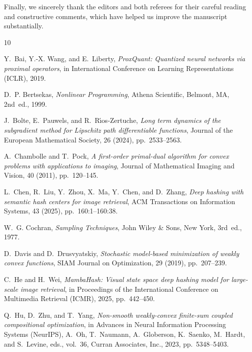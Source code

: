 \documentclass[11pt]{article}
\begin{document}
\bigskip
\noindent Finally, we sincerely thank the editors and both referees for their careful reading and constructive comments, which have helped us improve the manuscript substantially.

% 
% 
\begin{thebibliography}{10}

{\sc Y.~Bai, Y.-X. Wang, and E.~Liberty}, {\em {ProxQuant}: Quantized neural
  networks via proximal operators}, in International Conference on Learning
  Representations (ICLR), 2019.

{\sc D.~P. Bertsekas}, {\em Nonlinear Programming}, Athena Scientific, Belmont,
  MA, 2nd~ed., 1999.

{\sc J.~Bolte, E.~Pauwels, and R.~R{\'\i}os-Zertuche}, {\em Long term dynamics
  of the subgradient method for {L}ipschitz path differentiable functions},
  Journal of the European Mathematical Society, 26 (2024), pp.~2533--2563.

{\sc A.~Chambolle and T.~Pock}, {\em A first-order primal-dual algorithm for
  convex problems with applications to imaging}, Journal of Mathematical
  Imaging and Vision, 40 (2011), pp.~120--145.

{\sc L.~Chen, R.~Liu, Y.~Zhou, X.~Ma, Y.~Chen, and D.~Zhang}, {\em Deep hashing
  with semantic hash centers for image retrieval}, ACM Transactions on
  Information Systems, 43 (2025), pp.~160:1--160:38.

{\sc W.~G. Cochran}, {\em Sampling Techniques}, John Wiley \& Sons, New York,
  3rd~ed., 1977.

{\sc D.~Davis and D.~Drusvyatskiy}, {\em Stochastic model-based minimization of
  weakly convex functions}, SIAM Journal on Optimization, 29 (2019),
  pp.~207--239.

{\sc C.~He and H.~Wei}, {\em {{{MambaHash}}}: Visual state space deep hashing
  model for large-scale image retrieval}, in Proceedings of the International
  Conference on Multimedia Retrieval (ICMR), 2025, pp.~442--450.

{\sc Q.~Hu, D.~Zhu, and T.~Yang}, {\em Non-smooth weakly-convex finite-sum
  coupled compositional optimization}, in Advances in Neural Information
  Processing Systems (NeurIPS), A.~Oh, T.~Naumann, A.~Globerson, K.~Saenko,
  M.~Hardt, and S.~Levine, eds., vol.~36, Curran Associates, Inc., 2023,
  pp.~5348--5403.


\end{thebibliography}
\end{document}
